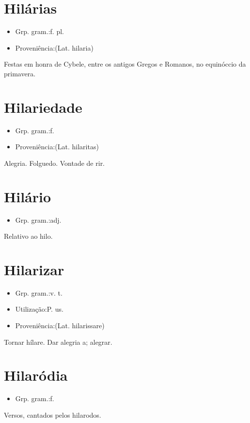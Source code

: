 \documentclass{article}
\begin{document}
\section{Hilárias}
\begin{itemize}
\item {Grp. gram.:f. pl.}
\end{itemize}
\begin{itemize}
\item {Proveniência:(Lat. \textunderscore hilaria\textunderscore )}
\end{itemize}
Festas em honra de Cybele, entre os antigos Gregos e Romanos, no equinóccio da primavera.
\section{Hilariedade}
\begin{itemize}
\item {Grp. gram.:f.}
\end{itemize}
\begin{itemize}
\item {Proveniência:(Lat. \textunderscore hilaritas\textunderscore )}
\end{itemize}
Alegria.
Folguedo.
Vontade de rir.
\section{Hilário}
\begin{itemize}
\item {Grp. gram.:adj.}
\end{itemize}
Relativo ao hilo.
\section{Hilarizar}
\begin{itemize}
\item {Grp. gram.:v. t.}
\end{itemize}
\begin{itemize}
\item {Utilização:P. us.}
\end{itemize}
\begin{itemize}
\item {Proveniência:(Lat. \textunderscore hilarissare\textunderscore )}
\end{itemize}
Tornar hílare.
Dar alegria a; alegrar.
\section{Hilaródia}
\begin{itemize}
\item {Grp. gram.:f.}
\end{itemize}
Versos, cantados pelos hilarodos.
\end{document}
